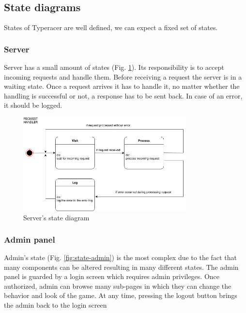 \documentclass[titlepage]{article}
\newcommand{\figref}[1]{{(Fig. \hypersetup{linkcolor=blue}\ref{#1})}}
\begin{document}
\subsection{State diagrams}

States of Typeracer are well defined, we can expect a fixed set of states.

\subsubsection{Server}

Server has a small amount of states \figref{fig:state-server}. Its responsibility is to accept incoming requests and handle them. Before receiving a request the server is in a waiting state. Once a request arrives it has to handle it, no matter whether the handling is successful or not, a response has to be sent back. In case of an error, it should be logged.

\begin{figure}[H]
	\centering
	\includegraphics[width=0.79\textwidth]{state_diagram_server.png}
	\caption{Server's state diagram}
	\label{fig:state-server}
\end{figure}

\subsubsection{Admin panel}

Admin's state \figref{fig:state-admin} is the most complex due to the fact that many components can be altered resulting in many different states. The admin panel is guarded by a login screen which requires admin privileges. Once authorized, admin can browse many sub-pages in which they can change the behavior and look of the game. At any time, pressing the logout button brings the admin back to the login screen
\end{document}
